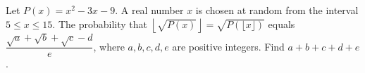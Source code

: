 Let $P(x)=x^2-3x-9$. A real number $x$ is chosen at random from the interval $5\le x\le15$. The probability that $\left\lfloor\sqrt{P(x)}\right\rfloor=\sqrt{P(\lfloor x\rfloor)}$ equals $\dfrac{\sqrt a+\sqrt b+\sqrt c-d}{e}$, where $a,b,c,d,e$ are positive integers. Find $a+b+c+d+e$.
